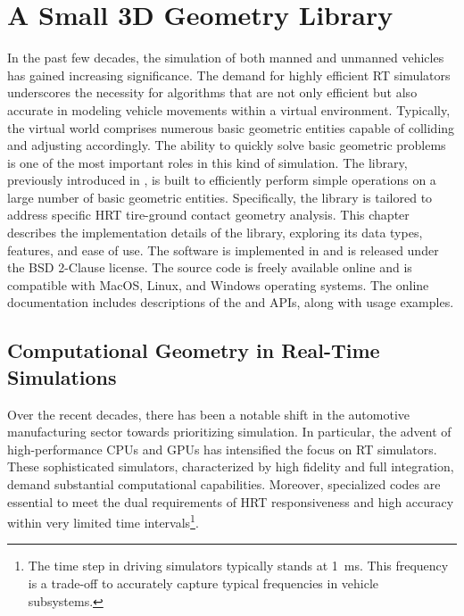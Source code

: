 
\chapter{A Small 3D Geometry Library}
\label{app1:acme}

In the past few decades, the simulation of both manned and unmanned vehicles has gained increasing significance. The demand for highly efficient \ac{RT} simulators underscores the necessity for algorithms that are not only efficient but also accurate in modeling vehicle movements within a virtual environment. Typically, the virtual world comprises numerous basic geometric entities capable of colliding and adjusting accordingly. The ability to quickly solve basic geometric problems is one of the most important roles in this kind of simulation. The \Acme{} library, previously introduced in \citet{stocco2021acme}, is built to efficiently perform simple operations on a large number of basic geometric entities. Specifically, the library is tailored to address specific \ac{HRT} tire-ground contact geometry analysis. This chapter describes the implementation details of the \Acme{} library, exploring its data types, features, and ease of use. The software is implemented in \cpp{} and is released under the \ac{BSD} 2-Clause license. The source code is freely available online and is compatible with MacOS, Linux, and Windows operating systems. The online documentation includes descriptions of the \cpp{} and \Matlab{} \Mex{} \acp{API}, along with usage examples.


\section{Computational Geometry in Real-Time Simulations}
\label{app1:sec:acme_motivation}

Over the recent decades, there has been a notable shift in the automotive manufacturing sector towards prioritizing simulation. In particular, the advent of high-performance \acp{CPU} and \acp{GPU} has intensified the focus on \ac{RT} simulators. These sophisticated simulators, characterized by high fidelity and full integration, demand substantial computational capabilities. Moreover, specialized codes are essential to meet the dual requirements of \ac{HRT} responsiveness and high accuracy within very limited time intervals\footnote{The time step in driving simulators typically stands at \SI{1}{\milli\second}. This frequency is a trade-off to accurately capture typical frequencies in vehicle subsystems.}.

